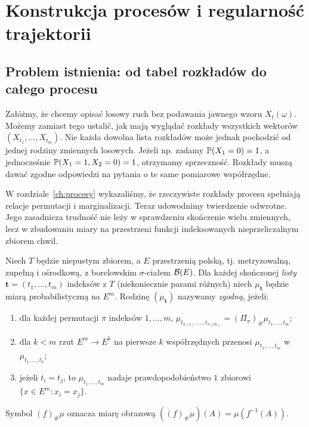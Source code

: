 \chapter{Konstrukcja procesów i regularność trajektorii}
\label{ch:konstrukcja}

\section{Problem istnienia: od tabel rozkładów do całego procesu}
Załóżmy, że chcemy opisać losowy ruch bez podawania jawnego wzoru
$X_t(\omega)$. Możemy zamiast tego ustalić, jak mają wyglądać
rozkłady wszystkich wektorów
$(X_{t_1},\ldots,X_{t_m})$. Nie każda dowolna lista rozkładów
może jednak pochodzić od jednej rodziny zmiennych losowych.
Jeżeli np. zadamy $\mathbb{P}(X_1=0)=1$, a jednocześnie
$\mathbb{P}(X_1=1,X_2=0)=1$, otrzymamy sprzeczność.
Rozkłady muszą dawać zgodne odpowiedzi na pytania o te same
pomiarowe współrzędne.

W rozdziale~\ref{ch:procesy} wykazaliśmy, że rzeczywiste
rozkłady procesu spełniają relacje permutacji i marginalizacji.
Teraz udowodnimy twierdzenie odwrotne. Jego zasadnicza trudność
nie leży w sprawdzeniu skończenie wielu zmiennych, lecz w
zbudowaniu miary na przestrzeni funkcji indeksowanych
nieprzeliczalnym zbiorem chwil.

\begin{definicja}
Niech $T$ będzie niepustym zbiorem, a $E$ przestrzenią polską,
tj. metryzowalną, zupełną i ośrodkową, z borelowskim
$\sigma$-ciałem $\mathcal{B}(E)$. Dla każdej skończonej
\emph{listy} $\mathbf t=(t_1,\ldots,t_m)$ indeksów z $T$
(niekoniecznie parami różnych) niech $\mu_{\mathbf t}$
będzie miarą probabilistyczną na $E^m$.
Rodzinę $(\mu_{\mathbf t})$ nazywamy \emph{zgodną}, jeżeli:
\begin{enumerate}
\item dla każdej permutacji $\pi$ indeksów $1,\ldots,m$,
$\mu_{t_{\pi(1)},\ldots,t_{\pi(m)}}=(\Pi_\pi)_\#\mu_{t_1,\ldots,t_m}$;
\item dla $k<m$ rzut $E^m\to E^k$ na pierwsze $k$ współrzędnych
przenosi $\mu_{t_1,\ldots,t_m}$ w $\mu_{t_1,\ldots,t_k}$;
\item jeżeli $t_i=t_j$, to $\mu_{t_1,\ldots,t_m}$ nadaje
prawdopodobieństwo $1$ zbiorowi $\{x\in E^m:x_i=x_j\}$.
\end{enumerate}
Symbol $(f)_\#\mu$ oznacza miarę obrazową
$((f)_\#\mu)(A)=\mu(f^{-1}(A))$.
\end{definicja}

